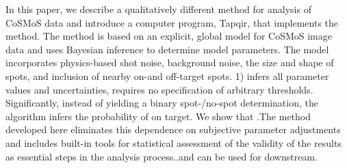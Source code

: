 In this paper, we describe a qualitatively different method for analysis of CoSMoS data and introduce a computer program, Tapqir, that implements the method. The method is based on an explicit, global model for CoSMoS image data and uses Bayesian inference to determine model parameters. The model incorporates physics-based shot noise, background noise, the size and shape of spots, and inclusion of nearby on-and off-target spots. 1) infers all parameter values and uncertainties, requires no specification of arbitrary thresholds. 
Significantly, instead of yielding a binary spot-/no-spot determination, the algorithm infers the probability of on target. We show that .The method developed here eliminates this dependence on subjective parameter adjustments and includes built-in tools for statistical assessment of the validity of the results as essential steps in the analysis process..and can be used for downstream.